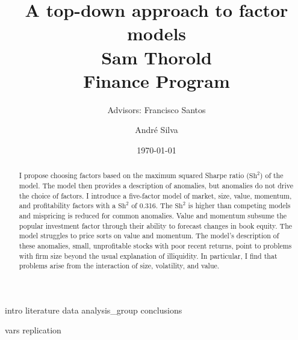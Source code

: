 \documentclass[a4paper, 12pt]{article}
\title{
  {A top-down approach to factor models}\\[1cm]
  {\Large Sam Thorold}\\%
  {\large Finance Program}\\
}
\author[1]{Advisors: Francisco Santos}
\affil[1]{Norwegian School of Economics}
\author[2]{Andr\'e Silva}
\affil[2]{NOVA School of Business and Economics}
\date{\today}
\begin{document}
\maketitle

\begin{abstract}
I propose choosing factors based on the maximum squared Sharpe ratio
($\text{Sh}^2$) of the model.
The model then provides a description of anomalies, but anomalies do not drive
the choice of factors.
I introduce a five-factor model of market, size, value, momentum, and
profitability factors with a $\text{Sh}^2$ of 0.316.
The $\text{Sh}^2$ is higher than competing models and mispricing is reduced
for common anomalies.
Value and momentum subsume the popular investment factor through their ability
to forecast changes in book equity.
The model struggles to price sorts on value and momentum.
The model's description of these anomalies, small, unprofitable stocks with
poor recent returns, point to problems with firm size beyond the usual
explanation of illiquidity.
In particular, I find that problems arise from the interaction of size,
volatility, and value.
\end{abstract}

\pagebreak


{intro}
{literature}
{data}
{analysis_group}
{conclusions}


\printbibliography

\appendix
{vars}
{replication}
\end{document}

